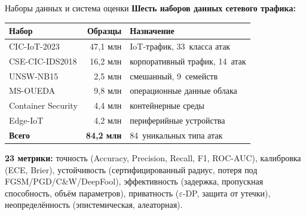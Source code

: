 \documentclass[10pt,aspectratio=169]{beamer}
\begin{document}
\begin{frame}{Наборы данных и система оценки}
\small
\textbf{Шесть наборов данных сетевого трафика:}
\smallskip
\begin{tabular}{@{}lrl@{}}
\toprule
\textbf{Набор} & \textbf{Образцы} & \textbf{Назначение} \\
\midrule
CIC-IoT-2023 & 47,1 млн & IoT-трафик, 33~класса атак \\
CSE-CIC-IDS2018 & 16,2 млн & корпоративный трафик, 14~атак \\
UNSW-NB15 & 2,5 млн & смешанный, 9~семейств \\
MS-OUEDA & 9,8 млн & операционные данные облака \\
Container Security & 4,4 млн & контейнерные среды \\
Edge-IoT & 4,2 млн & периферийные устройства \\
\midrule
\textbf{Всего} & \textbf{84,2 млн} & 84~уникальных типа атак \\
\bottomrule
\end{tabular}
\smallskip

\textbf{23 метрики:} точность (Accuracy, Precision, Recall,
F1, ROC-AUC), калибровка (ECE, Brier), устойчивость
(сертифицированный радиус, потеря под FGSM/PGD/C\&W/DeepFool),
эффективность (задержка, пропускная способность, объём
параметров), приватность ($\varepsilon$-DP, защита от
утечки), неопределённость (эпистемическая, алеаторная).
\end{frame}
\end{document}
